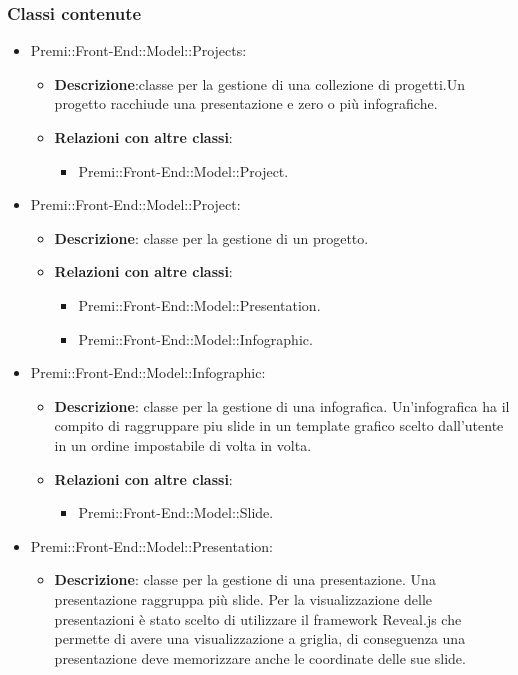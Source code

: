 	\subsubsection*{Classi contenute}
		\begin{itemize}
		 \item Premi::Front-End::Model::Projects:
			\begin{itemize}
				\item \textbf{Descrizione}:classe per la gestione di una collezione di progetti.Un progetto racchiude una presentazione e zero o più infografiche.
				\item \textbf{Relazioni con altre classi}:
				\begin{itemize}
					\item Premi::Front-End::Model::Project.
				\end{itemize}
			\end{itemize}
		\item  Premi::Front-End::Model::Project: 
			 \begin{itemize}
				\item \textbf{Descrizione}: classe per la gestione di un progetto.
				\item \textbf{Relazioni con altre classi}:
				\begin{itemize}
					\item Premi::Front-End::Model::Presentation.
					\item Premi::Front-End::Model::Infographic.
				\end{itemize}
			\end{itemize}
		 \item  Premi::Front-End::Model::Infographic:
			\begin{itemize}
				\item \textbf{Descrizione}: classe per la gestione di una infografica. Un'infografica ha il compito di raggruppare piu slide in un template grafico scelto dall'utente in un ordine impostabile di volta in volta.
				\item \textbf{Relazioni con altre classi}:
				\begin{itemize}
					\item Premi::Front-End::Model::Slide.
				\end{itemize}
			\end{itemize}
		 \item   Premi::Front-End::Model::Presentation:
			\begin{itemize}
				\item \textbf{Descrizione}: classe per la gestione di una presentazione. Una presentazione raggruppa più slide. Per la visualizzazione delle presentazioni è stato scelto di utilizzare il framework Reveal.js che permette di avere una visualizzazione a griglia, di conseguenza una presentazione deve memorizzare anche le coordinate delle sue slide.

\end{itemize}
\end{itemize}
